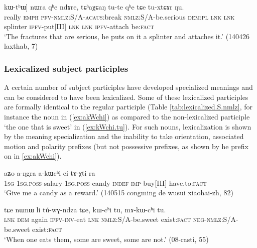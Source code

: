 \begin{exe}
\ex \label{ex:pWkWNGlWt.kWthW}
\gll  [wuma ʑo [pɯ-kɯ-ɴɢlɯt] kɯ-tʰɯ] nɯra qʰe ndɤre, tɕʰaχɕaŋ tu-te qʰe tɕe tu-xtɕɤr ŋu.  \\
really \textsc{emph} \textsc{pfv}-\textsc{nmlz}:S/A-\textsc{acaus}:break \textsc{nmlz}:S/A-be.serious \textsc{dem}:\textsc{pl} \textsc{lnk}   \textsc{lnk} splinter \textsc{ipfv}-put[III]   \textsc{lnk}  \textsc{lnk} \textsc{ipfv}-attach be:\textsc{fact} \\
\glt `The fractures that are serious, he puts on it a splinter and attaches it.' (140426 laxthab, 7)
\end{exe}

\subsubsection{Lexicalized subject participles} \label{sec:lexicalized.subject.participle}
A certain number of subject participles have developed specialized meanings and can be considered to have been lexicalized. Some of these lexicalized participles are formally identical to the regular participle (Table  \ref{tab:lexicalized.S.nmlz}, for instance the noun  in (\ref{ex:akWchi})  as compared to the non-lexicalized participle  `the one that is sweet' in (\ref{ex:kWchi.tu}). For such nouns, lexicalization is shown by the meaning specialization and the inability to take orientation, associated motion and polarity prefixes (but not possessive prefixes, as shown by he prefix  on  in \ref{ex:akWchi}).

\begin{exe}
\ex \label{ex:akWchi}
 \gll aʑo a-ŋgra a-kɯcʰi ci tɤ-χti ra \\
 \textsc{1sg} \textsc{1sg}.\textsc{poss}-salary \textsc{1sg}.\textsc{poss}-candy \textsc{indef} \textsc{imp}-buy[III] have.to:\textsc{fact} \\
\glt `Give me a candy as a reward.' (140515 congming de wusui xiaohai-zh, 82)
\end{exe}

\begin{exe}
\ex \label{ex:kWchi.tu}
 \gll tɕe nɯnɯ li tú-wɣ-ndza tɕe, kɯ-cʰi tu, mɤ-kɯ-cʰi tu. \\
\textsc{lnk} \textsc{dem} again \textsc{ipfv}-\textsc{inv}-eat \textsc{lnk} \textsc{nmlz}:S/A-be.sweet exist:\textsc{fact} \textsc{neg}-\textsc{nmlz}:S/A-be.sweet exist:\textsc{fact} \\
\glt `When one eats them, some are sweet, some are not.' (08-rasti, 55)
\end{exe}

